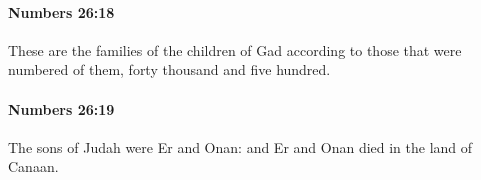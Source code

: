 		\paragraph{Numbers 26:18} %
			\label{NUMBERS-26-18}

			These are the families of the children of Gad according to those that were numbered of them, forty thousand and five hundred.


		\paragraph{Numbers 26:19} %
			\label{NUMBERS-26-19}

			The sons of Judah were Er and Onan: and Er and Onan died in the land of Canaan.


